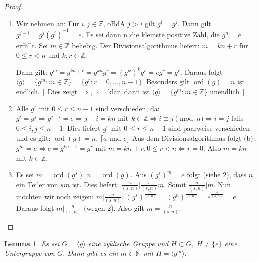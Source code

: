 \documentclass[12pt]{scrartcl}%
\newtheorem{lemma}{Lemma}
\theoremstyle{definition}
\theoremstyle{remark}
\DeclareMathOperator\ord{ord}
\begin{document}
\begin{proof}
	\begin{enumerate}
		\item Wir nehmen an: Für $i,j \in \mathbb{Z}$, oBdA $j>i$ gilt $g^{i}=g^{j}$.
		Dann gilt $g^{j-i}=g^{j}(g^{i})^{-1}=e$.
		Es sei dann n die kleinste positive Zahl, die $g^{n}=e$ erfüllt.
		Sei $m \in \mathbb{Z}$ beliebig.
		Der Divisionsalgorithmus liefert: $m=kn+r$ für $0 \leq r < n$ und $k,r \in \mathbb{Z}$.

		Dann gilt:
		$g^{m}=g^{kn+r}=g^{kn}g^{r}=(g^{n})^{k}g^{r}=eg^{r}=g^{r}$.
		Daraus folgt $\langle g \rangle = \lbrace g^{m} : m \in \mathbb{Z}\rbrace = \lbrace g^{r} : r=0,...,n-1\rbrace$.
		Besonders gilt $\ord(g)=n$ ist endlich.
		$\lceil$ Dies zeigt $\Rightarrow$, $\Leftarrow$ klar, dann ist $\langle g \rangle = \lbrace g^{m} : m \in \mathbb{Z}\rbrace$ unendlich $\rfloor$
		\item Alle $g^{r}$ mit $0 \leq r \leq n-1$ sind verschieden, da:
		$g^{i}=g^{j} \Rightarrow g^{j-i}=e \Rightarrow j-i = kn$ mit $k\in\mathbb{Z} \Rightarrow i \equiv j \pmod{n} \Rightarrow i=j$ falls $0\leq i,j\leq n-1$.
		Dies liefert $g^{r}$ mit $0 \leq r \leq n-1$ sind paarweise verschieden und es gilt: $\ord(g)=n$. $\lceil a$ und $c\rfloor$
		Aus dem Divisionsalgorithmus folgt (b): $g^{m}=e \Leftrightarrow e=g^{kn+r}=g^{r}$ mit $m = kn+r, 0 \leq r < n \Leftrightarrow r=0$.
		Also $m=kn$ mit $k \in \mathbb{Z}$. %
		\item Es sei $m=\ord(g^{s}), n =\ord(g)$.
		Aus $(g^{s})^{m}=e$ folgt (siehe 2), dass $n$ ein Teiler von $sm$ ist.
		Dies liefert: $\frac{n}{(s,n)} \vert \frac{s}{(s,n)}m$. Somit $\frac{n}{(s,n)} \vert m$.
		Nun möchten wir noch zeigen: $m \vert \frac{n}{(s,n)}$. $(g^{s})^{\frac{n}{(s,n)}} = (g^{n})^{\frac{s}{(s,n)}}=e^{\frac{s}{(s,n)}}=e$.
		Daraus folgt $m \vert \frac{n}{(s,n)}$ (wegen 2).
		Also gilt $m = \frac{n}{(s,n)}$. \qedhere
	\end{enumerate}
\end{proof}

\begin{lemma}
	Es sei $G = \langle g \rangle$ eine zyklische Gruppe und $H \subset G,\; H\neq\{e\}$ eine Untergruppe von $G$. Dann gibt es ein $m\in\mathbb{N}$ mit $H=\langle g^m\rangle$.
\end{lemma}
\end{document}
